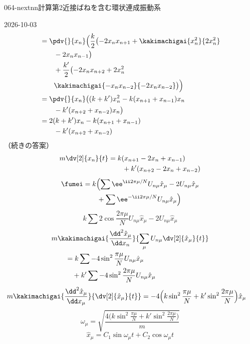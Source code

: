 \documentclass[uplatex,dvipdfmx,a4paper,11pt]{jsarticle}
\begin{document}
\begin{mondai}{064-nextnn}{計算}{第2近接ばねを含む環状連成振動系}
\begin{kotaeutsushi}{2026-10-03}
\begin{align*}
  &=\pdv{}{x_n}\Bigl(\frac{k}{2}\bigl(-2x_nx_{n+1}+\kakimachigai{x_n^{2}}{2x_n^{2}}\\
  &\qquad-2x_nx_{n-1}\bigr)\\
  &\qquad+\frac{k'}{2}\bigl(-2x_nx_{n+2}+2x_n^{2}\\
  &\qquad\kakimachigai{-x_nx_{n-2}}{-2x_nx_{n-2}}\bigr)\Bigr)\\
  &=\pdv{}{x_n}\bigl((k+k')x_n^{2}-k(x_{n+1}+x_{n-1})x_n\\
  &\qquad-k'(x_{n+2}+x_{n-2})x_n\bigr)\\
  &=2(k+k')x_n-k(x_{n+1}+x_{n-1})\\
  &\qquad-k'(x_{n+2}+x_{n-2})
\end{align*}
（続きの答案）
\begin{align*}
  m\dv[2]{x_n}{t}&=k(x_{n+1}-2x_n+x_{n-1})\\
  &\qquad+k'(x_{n+2}-2x_n+x_{n-2})
\end{align*}
\mikai
{}
\begin{align*}
  \fumei&=k\Bigl(\sum\ee^{\ii2\pi\mu/N}U_{n\mu}\hat{x}_{\mu}-2U_{n\mu}\hat{x}_{\mu}\\
  &\qquad+\sum\ee^{-\ii2\pi\mu/N}U_{n\mu}\hat{x}_{\mu}\Bigr)
\end{align*}
\[
  k\sum2\cos\frac{2\pi\mu}{N}U_{n\mu}\hat{x}_{\mu}-2U_{n\mu}\hat{x}_{\mu}
\]
\begin{align*}
  &m\kakimachigai{\frac{\dd^{2}\hat{x}_{\mu}}{\dd x_n}}{\sum_{\mu}U_{n\mu}\dv[2]{\hat{x}_{\mu}}{t}}\\
  &\qquad=k\sum-4\sin^{2}\frac{\pi\mu}{N}U_{n\mu}\hat{x}_{\mu}\\
  &\qquad\quad+k'\sum-4\sin^{2}\frac{2\pi\mu}{N}U_{n\mu}\hat{x}_{\mu}
\end{align*}
\begin{align*}
  m\kakimachigai{\frac{\dd^{2}\hat{x}_{\mu}}{\dd x_{\mu}}}{\dv[2]{\hat{x}_{\mu}}{t}}&=-4\Bigl(k\sin^{2}\frac{\pi\mu}{N}+k'\sin^{2}\frac{2\pi\mu}{N}\Bigr)\hat{x}_{\mu}
\end{align*}
\[
  \omega_{\mu}=\sqrt{\frac{4\bigl(k\sin^{2}\frac{\pi\mu}{N}+k'\sin^{2}\frac{2\pi\mu}{N}\bigr)}{m}}
\]
\[
  \hat{x}_{\mu}=C_1\sin\omega_{\mu}t+C_2\cos\omega_{\mu}t
\]
\[
\]
\end{kotaeutsushi}
\end{mondai}
\end{document}
